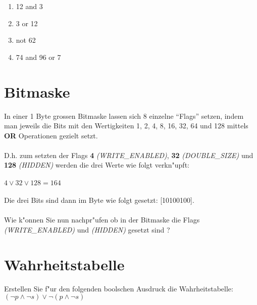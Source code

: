 \documentclass[a4paper,10pt]{article}
\begin{document}
\begin{enumerate}
\item 12 and 3
\item 3 or 12
\item not 62
\item 74 and 96 or 7

\end{enumerate}

\section{Bitmaske}
In einer 1 Byte grossen Bitmaske lassen sich 8 einzelne ``Flags'' setzen, indem man jeweils die Bits mit den Wertigkeiten 1, 2, 4, 8, 16, 32, 64 und 128 mittels \textbf{OR} Operationen gezielt setzt. \\ \\
D.h. zum setzten der Flags \textbf{4} \textit{(WRITE\_ENABLED)}, \textbf{32} \textit{(DOUBLE\_SIZE)} und \textbf{128} \textit{(HIDDEN)} werden die drei Werte wie folgt verkn"upft: \\ \\
$4 \lor  32 \lor 128 = 164$ \\ \\
Die drei Bits sind dann im Byte wie folgt gesetzt: [10100100]. \\ \\
Wie k"onnen Sie nun nachpr"ufen ob in der Bitmaske die Flags \textit{(WRITE\_ENABLED)} und \textit{(HIDDEN)} gesetzt sind ?

\section{Wahrheitstabelle}
Erstellen Sie f"ur den folgenden boolschen Ausdruck die Wahrheitstabelle:\\
$(\lnot p \land \lnot s) \lor \lnot(p \land \lnot s)$
\end{document}
